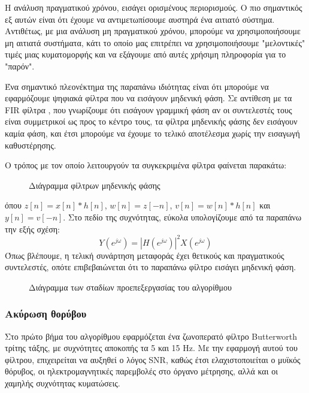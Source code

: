 Η ανάλυση πραγματικού χρόνου, εισάγει ορισμένους περιορισμούς. Ο πιο σημαντικός εξ αυτών είναι ότι έχουμε να αντιμετωπίσουμε αυστηρά ένα αιτιατό σύστημα. Αντιθέτως, με μια ανάλυση μη πραγματικού χρόνου, μπορούμε να χρησιμοποιήσουμε μη αιτιατά συστήματα, κάτι το οποίο μας επιτρέπει να χρησιμοποιήσουμε "μελοντικές" τιμές μιας κυματομορφής και να εξάγουμε από αυτές χρήσιμη πληροφορία για το "παρόν".

Ένα σημαντικό πλεονέκτημα της παραπάνω ιδιότητας είναι ότι μπορούμε να εφαρμόζουμε ψηφιακά φίλτρα που να εισάγουν μηδενική φάση. Σε αντίθεση με τα FIR φίλτρα \cite{wikiFIR}, που γνωρίζουμε ότι εισάγουν γραμμική φάση αν οι συντελεστές τους είναι συμμετρικοί ως προς το κέντρο τους, τα φίλτρα μηδενικής φάσης δεν εισάγουν καμία φάση, και έτσι μπορούμε να έχουμε το τελικό αποτέλεσμα χωρίς την εισαγωγή καθυστέρησης.

Ο τρόπος με τον οποίο λειτουργούν τα συγκεκριμένα φίλτρα φαίνεται παρακάτω:

\begin{figure}[h]
    \centering
    
    \caption{Διάγραμμα φίλτρων μηδενικής φάσης}
    \label{fig:zero_phase_fir}
\end{figure}

όπου $z[n] = x[n]*h[n]$, $w[n] = z[-n]$, $v[n] = w[n]*h[n]$ και $y[n] = v[-n]$.
Στο πεδίο της συχνότητας, εύκολα υπολογίζουμε από τα παραπάνω την εξής σχέση:
\begin{equation}
\label{eq:zero_phase_eq}
   Y(e^{j\omega}) = |H(e^{j\omega})|^2X(e^{j\omega})
\end{equation}
Όπως βλέπουμε, η τελική συνάρτηση μεταφοράς έχει θετικούς και πραγματικούς συντελεστές, οπότε επιβεβαιώνεται ότι το παραπάνω φίλτρο εισάγει μηδενική φάση.


\begin{figure}[h]
    \centering
    
    \caption{Διάγραμμα των σταδίων προεπεξεργασίας του αλγορίθμου}
    \label{fig:panTompkins_block}
\end{figure}

\subsubsection*{Ακύρωση θορύβου}
Στο πρώτο βήμα του αλγορίθμου εφαρμόζεται ένα ζωνοπερατό φίλτρο Butterworth \cite{wikiButter} τρίτης τάξης, με συχνότητες αποκοπής τα 5 και 15 Hz. Με την εφαρμογή αυτού του φίλτρου, επιχειρείται να αυξηθεί ο λόγος SNR, καθώς έτσι ελαχιστοποιείται ο μυϊκός θόρυβος, οι ηλεκτρομαγνητικές παρεμβολές στο όργανο μέτρησης, αλλά και οι χαμηλής συχνότητας κυματώσεις.

